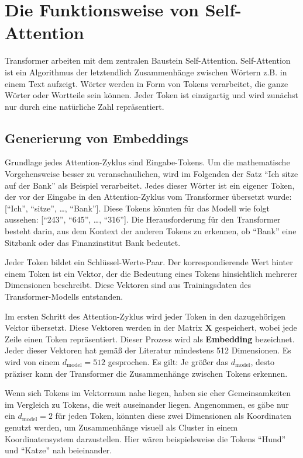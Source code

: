 \chapter{Die Funktionsweise von Self-Attention}

Transformer arbeiten mit dem zentralen Baustein Self-Attention.
Self-Attention ist ein Algorithmus der letztendlich Zusammenhänge zwischen Wörtern z.B. in einem Text aufzeigt.
Wörter werden in Form von Tokens verarbeitet, die ganze Wörter oder Wortteile sein können.
Jeder Token ist einzigartig und wird zunächst nur durch eine natürliche Zahl repräsentiert.

\section{Generierung von Embeddings}

Grundlage jedes Attention-Zyklus sind Eingabe-Tokens.  
Um die mathematische Vorgehensweise besser zu veranschaulichen, wird im Folgenden der Satz \enquote{Ich sitze auf der Bank} als Beispiel verarbeitet.
Jedes dieser Wörter ist ein eigener Token, der vor der Eingabe in den Attention-Zyklus vom Transformer übersetzt wurde:
[\enquote{Ich}, \enquote{sitze}, \dots, \enquote{Bank}].  
Diese Tokens könnten für das Modell wie folgt aussehen: [\enquote{243}, \enquote{645}, \dots, \enquote{316}].
Die Herausforderung für den Transformer besteht darin, aus dem Kontext der anderen Tokens zu erkennen, ob \enquote{Bank} eine Sitzbank oder das Finanzinstitut Bank bedeutet.

Jeder Token bildet ein Schlüssel-Werte-Paar.  
Der korrespondierende Wert hinter einem Token ist ein Vektor, der die Bedeutung eines Tokens hinsichtlich mehrerer Dimensionen beschreibt.  
Diese Vektoren sind aus Trainingsdaten des Transformer-Modells entstanden.

Im ersten Schritt des Attention-Zyklus wird jeder Token in den dazugehörigen Vektor übersetzt.  
Diese Vektoren werden in der Matrix $\mathbf{X}$ gespeichert, wobei jede Zeile einen Token repräsentiert.  
Dieser Prozess wird als \textbf{Embedding} bezeichnet.  
Jeder dieser Vektoren hat gemäß der Literatur mindestens 512 Dimensionen.  
Es wird von einem \( d_{\text{model}} = 512 \) gesprochen.  
Es gilt: Je größer das \( d_{\text{model}} \), desto präziser kann der Transformer die Zusammenhänge zwischen Tokens erkennen.

Wenn sich Tokens im Vektorraum nahe liegen, haben sie eher Gemeinsamkeiten im Vergleich zu Tokens, die weit auseinander liegen.  
Angenommen, es gäbe nur ein \( d_{\text{model}} = 2 \) für jeden Token, könnten diese zwei Dimensionen als Koordinaten genutzt werden, um Zusammenhänge visuell als Cluster in einem Koordinatensystem darzustellen.  
Hier wären beispielsweise die Tokens \enquote{Hund} und \enquote{Katze} nah beieinander.

